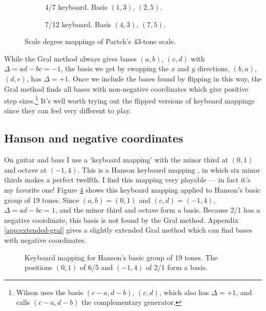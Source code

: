 \documentclass[a4paper,11pt]{article}
\begin{document}
\begin{figure}
\begin{subfigure}{\textwidth}

\caption{4/7 keyboard. Basis $(1, 3)$, $(2, 5)$.}
\vspace{0.5cm}
\label{fig:partch4-7}
\end{subfigure}
\begin{subfigure}{\textwidth}

\caption{7/12 keyboard. Basis $(4, 3)$, $(7, 5)$.}
\vspace{0.25cm}
\label{fig:partch7-12}
\end{subfigure}
\caption{Scale degree mappings of Partch's 43-tone scale.}
\end{figure}

While the Gral method always gives bases $(a, b)$, $(c, d)$ with $\Delta = ad -
bc = -1$, the basis we get by swapping the $x$ and $y$ directions, $(b, a)$,
$(d, c)$, has $\Delta = +1$. Once we include the bases found by flipping in
this way, the Gral method finds all bases with non-negative coordinates which
give positive step sizes.\footnote{ Wilson uses the basis $(c - a, d - b)$,
$(c, d)$, which also has $\Delta = +1$, and calls $(c - a, d - b)$ the
complementary generator.} It's well worth trying out the flipped versions of
keyboard mappings since they can feel very different to play.

\subsection{Hanson and negative coordinates}
On guitar and bass I use a `keyboard mapping' with the minor third at $(0, 1)$
and octave at $(-1, 4)$. This is a Hanson keyboard mapping
\cite{hanson1989development}, in which six minor thirds makes a perfect
twelfth. I find this mapping very playable --- in fact it's my favorite one!
Figure \ref{fig:hanson} shows this keyboard mapping applied to Hanson's basic
group of 19 tones. Since $(a, b) = (0, 1)$ and $(c, d) = (-1, 4)$, $\Delta = ad
- bc = 1$, and the minor third and octave form a basis.  Because 2/1 has a
negative coordinate, this basis is not found by the Gral method.  Appendix
\ref{app:extended-gral} gives a slightly extended Gral method which can find
bases with negative coordinates.

\begin{figure}

\caption{Keyboard mapping for Hanson's basic group of 19 tones. The positions $(0, 1)$
of 6/5 and $(-1, 4)$ of 2/1 form a basis.}
\label{fig:hanson}
\end{figure}
\end{document}

